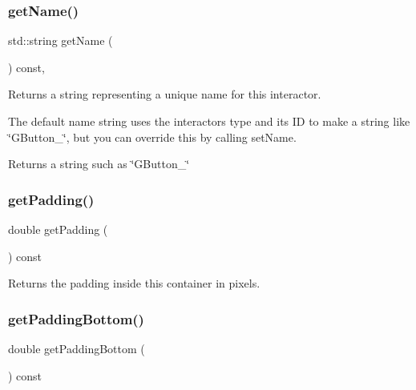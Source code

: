 \subsubsection{\texorpdfstring{get\+Name()}{getName()}}
{\footnotesize\ttfamily std\+::string get\+Name (\begin{DoxyParamCaption}{ }\end{DoxyParamCaption}) const\hspace{0.3cm}{\ttfamily [virtual]}, {\ttfamily [inherited]}}



Returns a string representing a unique name for this interactor. 

The default name string uses the interactor\textquotesingle{}s type and its ID to make a string like \char`\"{}\+G\+Button\+\_\char`\"{}, but you can override this by calling set\+Name. \begin{DoxyReturn}{Returns}
a string such as \char`\"{}\+G\+Button\+\_\char`\"{} 
\end{DoxyReturn}
\mbox{\label{classsgl_1_1GContainer_a19fdf4f4500aead343992102066983cb}} 
\subsubsection{\texorpdfstring{get\+Padding()}{getPadding()}}
{\footnotesize\ttfamily double get\+Padding (\begin{DoxyParamCaption}{ }\end{DoxyParamCaption}) const\hspace{0.3cm}{\ttfamily [virtual]}}



Returns the padding inside this container in pixels. 

\mbox{\label{classsgl_1_1GContainer_a5696e2debbbafb717c0d47e069b896e4}} 
\subsubsection{\texorpdfstring{get\+Padding\+Bottom()}{getPaddingBottom()}}
{\footnotesize\ttfamily double get\+Padding\+Bottom (\begin{DoxyParamCaption}{ }\end{DoxyParamCaption}) const\hspace{0.3cm}{\ttfamily [virtual]}}




